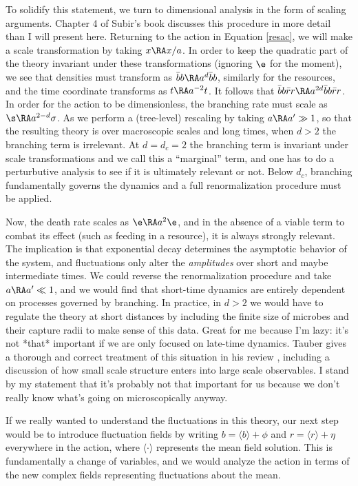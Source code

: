 \documentclass[aps,prx,groupedaddress,notitlepage]{revtex4-1} %
\begin{document}
To solidify this statement, we turn to dimensional analysis in the form of scaling arguments. Chapter 4 of Subir's book\cite{sachdev2011quantum} discusses this procedure in more detail than I will present here. Returning to the action in Equation \ref{resac}, we will make a scale transformation by taking $x\RA x/a$. In order to keep the quadratic part of the theory invariant under these transformations (ignoring $\e$ for the moment), we see that densities must transform as $\bar b b\RA a^{d} \bar b b$, similarly for the resources, and the time coordinate transforms as $t\RA a^{-2} t$. It follows that $\bar b b \bar r r \RA a^{2d} \bar b b \bar r r$. In order for the action to be dimensionless, the branching rate must scale as $\s \RA a^{2-d} \sigma$. As we perform a (tree-level) rescaling by taking $a \RA a' \gg 1$, so that the resulting theory is over macroscopic scales and long times, when $d>2$ the branching term is irrelevant. At $d=d_c=2$ the branching term is invariant under scale transformations and we call this a ``marginal'' term, and one has to do a perturbutive analysis to see if it is ultimately relevant or not. Below $d_c$, branching fundamentally governs the dynamics and a full renormalization procedure must be applied.

Now, the death rate scales as $\e \RA a^2 \e$, and in the absence of a viable term to combat its effect (such as feeding in a resource), it is always strongly relevant. The implication is that exponential decay determines the asymptotic behavior of the system, and fluctuations only alter the \textit{amplitudes} over short and maybe intermediate times.  We could reverse the renormalization procedure and take $a \RA a' \ll 1$, and we would find that short-time dynamics are entirely dependent on processes governed by branching. In practice, in $d>2$ we would have to regulate the theory at short distances by including the finite size of microbes and their capture radii to make sense of this data. Great for me because I'm lazy: it's not *that* important if we are only focused on late-time dynamics. Tauber gives a thorough and correct treatment of this situation in his review \cite{tauber2005applications}, including a discussion of how small scale structure enters into large scale observables. I stand by my statement that it's probably not that important for us because we don't really know what's going on microscopically anyway.

If we really wanted to understand the fluctuations in this theory, our next step would be to introduce fluctuation fields by writing $b = \langle b\rangle +\phi$ and $r = \langle r\rangle + \eta$ everywhere in the action, where $\langle \cdot\rangle$ represents the mean field solution. This is fundamentally a change of variables, and we would analyze the action in terms of the new complex fields representing fluctuations about the mean.  
\end{document}
